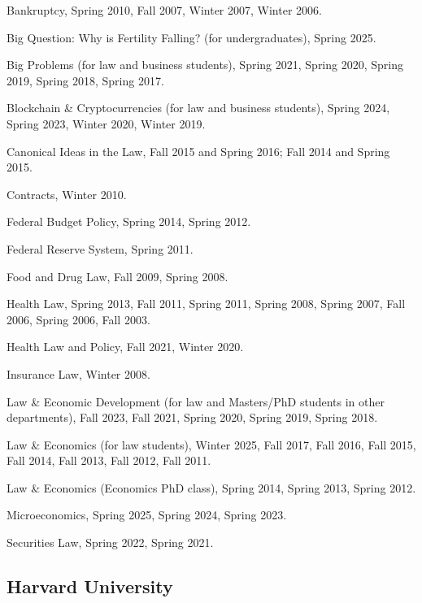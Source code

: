 \documentclass[11pt,letterpaper]{report}
\newcommand{\listitemspace}{0.25em}
\renewenvironment{itemize}
{\begin{list}{}{\setlength{\leftmargin}{0em}
                \setlength{\parskip}{0em}
                \setlength{\itemsep}{\listitemspace}
                \setlength{\parsep}{\listitemspace}}}
{\end{list}}
\begin{document}
    \begin{itemize}

        \item Bankruptcy, Spring 2010, Fall 2007, Winter 2007, Winter 2006.
        \item Big Question: Why is Fertility Falling? (for undergraduates), Spring 2025.
        \item Big Problems (for law and business students), Spring 2021, Spring 2020, Spring 2019, Spring 2018, Spring 2017. 
        \item Blockchain \& Cryptocurrencies (for law and business students), Spring 2024, Spring 2023, Winter 2020, Winter 2019.
        \item Canonical Ideas in the Law, Fall 2015 and Spring 2016; Fall 2014 and Spring 2015.
        \item Contracts, Winter 2010.
        \item Federal Budget Policy, Spring 2014, Spring 2012.
        \item Federal Reserve System, Spring 2011.  
        \item Food and Drug Law, Fall 2009, Spring 2008.
        \item Health Law, Spring 2013, Fall 2011, Spring 2011, Spring 2008, Spring 2007, Fall 2006, Spring 2006, Fall 2003.
        \item Health Law and Policy, Fall 2021, Winter 2020.
        \item Insurance Law, Winter 2008.
        \item Law \& Economic Development (for law and Masters/PhD students in other departments), Fall 2023, Fall 2021, Spring 2020, Spring 2019, Spring 2018.
        \item Law \& Economics (for law students), Winter 2025, Fall 2017, Fall 2016, Fall 2015, Fall 2014, Fall 2013, Fall 2012, Fall 2011.
        \item Law \& Economics (Economics PhD class), Spring 2014, Spring 2013, Spring 2012.
        \item Microeconomics, Spring 2025, Spring 2024, Spring 2023. 
        \item Securities Law, Spring 2022, Spring 2021. 
        
    \end{itemize}

    \subsection*{Harvard University}
\end{document}
